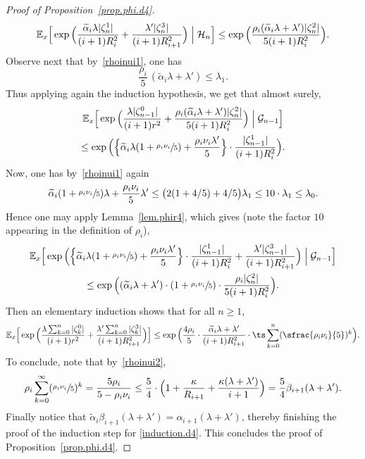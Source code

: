 \begin{proof}[Proof of Proposition~\ref{prop.phi.d4}]
\[
\mathbb E_x\Big[\exp\Big(\frac{\widetilde \alpha_i\lambda |\zeta_n^1|}{(i+1)R_i^2}+ \frac{\lambda' |\zeta^3_n|}{(i+1)R_{i+1}^2}\Big)
\Bigm|\mathcal H_n \Big] \le
\exp\Big(\frac{\rho_i(\widetilde \alpha_i \lambda + \lambda') |\zeta_n^2|}{5(i+1)R_i^2}\Big).
\]
Observe next that by~\eqref{rhoinui1}, one has
\[
\frac{\rho_i}{5}\,(\widetilde \alpha_i \lambda + \lambda')\le \lambda_1.
\]
Thus applying again the induction hypothesis, we get that almost surely,
\begin{multline*}
\mathbb E_x\Big[\exp\Big(\frac{\lambda |\zeta_{n-1}^0|}{(i+1)r^2}+ \frac{\rho_i(\widetilde \alpha_i \lambda + \lambda') |\zeta_n^2|}{5(i+1)R_i^2}\Big) \Bigm|\mathcal G_{n-1} \Big]\\
\le \exp \Big(\Big\{ \widetilde \alpha_i \lambda(1 +\sfrac{\rho_i\nu_i}{5}) + \frac{\rho_i\nu_i\lambda'}{5}\Big\} \cdot \frac{|\zeta_{n-1}^1|}{(i+1)R_i^2}\Big).
\end{multline*}
Now, one has by~\eqref{rhoinui1} again
\[
\widetilde \alpha_i(1+\sfrac{\rho_i\nu_i}{5})\lambda + \frac{\rho_i\nu_i}{5}\lambda' \le \big(2(1+4/5) +4/5\big)\lambda_1 \le 10\cdot \lambda_1 \le \lambda_0.
\]
Hence one may apply Lemma~\ref{lem.phir4}, which gives (note the factor $10$ appearing in the definition of $\rho_i$),
\begin{multline*}
\mathbb E_x\Big[\exp \Big(\Big\{ \widetilde \alpha_i\lambda(1 +\sfrac{\rho_i\nu_i}{5}) + \frac{\rho_i\nu_i\lambda'}{5}\Big\} \cdot \frac{|\zeta_{n-1}^1|}{(i+1)R_i^2}+ \frac{\lambda'|\zeta_{n-1}^3|}{(i+1)R_{i+1}^2}\Big)\Bigm| \mathcal G_{n-1} \Big] \\
\le \exp\Big((\widetilde \alpha_i\lambda + \lambda')\cdot(1+\sfrac{\rho_i\nu_i}{5})\cdot \frac{ \rho_i |\zeta_n^2|}{5(i+1)R_i^2}\Big).
\end{multline*}
Then an elementary induction shows that for all $n\ge 1$,
\[
\mathbb E_x\Big[\exp\Big(\frac{\lambda\sum_{k=0}^n |\zeta_k^0|}{(i+1)r^2}+\frac{\lambda'\sum_{k=0}^n |\zeta^3_k|}{(i+1)R_{i+1}^2}\Big)\Big]
\le \exp\Big(\frac{4\rho_i}{5}\cdot \frac{ \widetilde \alpha_i\lambda+\lambda'}{(i+1)R_{i+1}^2}\cdot \ts\sum_{k=0}^n (\sfrac{\rho_i\nu_i}{5})^{k}\Big).
\]
To conclude, note that by~\eqref{rhoinui2},\vspace*{-3pt}
\[
\rho_i\sum_{k=0}^\infty (\sfrac{\rho_i\nu_i}{5})^{k} = \frac{5\rho_i}{5-\rho_i\nu_i} \le \frac{5}{4}\cdot \Big(1+\frac{\kappa }{R_{i+1}} + \frac{\kappa(\lambda+\lambda')}{i+1}\Big) =\frac 54 \beta_{i+1}(\lambda+\lambda').
\]
Finally notice that $\widetilde \alpha_i \beta_{i+1}(\lambda+\lambda') = \alpha_{i+1}(\lambda+\lambda')$, thereby finishing the proof of the induction
step for \eqref{induction.d4}.
This concludes the proof of Proposition~\ref{prop.phi.d4}.
\end{proof}


